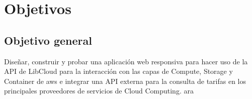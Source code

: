 \chapter{Objetivos} %

\label{ch:objetivos} %

\section{Objetivo general}
Diseñar, construir y probar una aplicación web responsiva para hacer uso de la \acs{API} de LibCloud para la interacción con las capas de Compute, Storage y Container de \acs{aws} e integrar una API externa para  la consulta de tarifas en los principales proveedores de servicios de Cloud Computing.
ara 